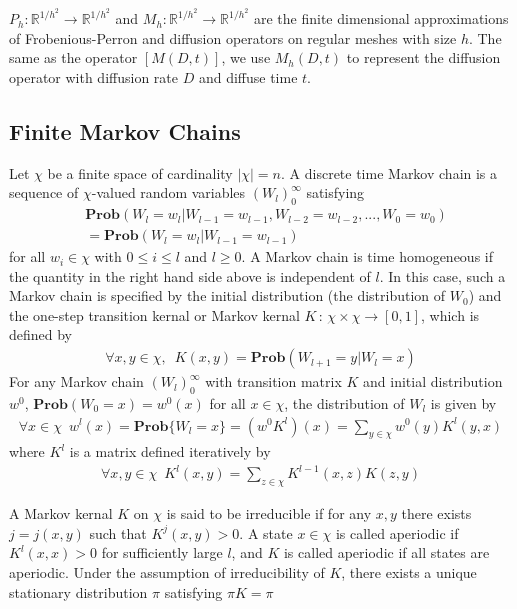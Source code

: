 \documentclass{article}
\begin{document}
$P_h: \mathbb{R}^{1/h^2} \rightarrow \mathbb{R}^{1/h^2} $ and $M_h: \mathbb{R}^{1/h^2} \rightarrow \mathbb{R}^{1/h^2}$ are the finite dimensional approximations of Frobenious-Perron and diffusion operators on regular meshes with size $h$. The same as the operator $[M(D,t)]$, we use $M_h(D,t)$ to represent the diffusion operator with diffusion rate $D$ and diffuse time $t$.


\subsection{Finite Markov Chains}
Let $\chi$ be a finite space of cardinality $|\chi|=n$. A discrete time Markov chain is a sequence of $\chi$-valued random variables $(W_l)_0^{\infty}$ satisfying
\begin{eqnarray*}
 &\mathbf{Prob}(W_l = w_l | W_{l-1} = w_{l-1},W_{l-2} = w_{l-2},...,W_0 = w_0)  \\
 &=\mathbf{Prob}(W_{l} = w_l | W_{l-1} = w_{l-1})
\end{eqnarray*}
for all $w_i \in \chi$ with $0 \le i \le l$ and $l\ge 0$. A Markov chain is time homogeneous if the quantity in the right hand side above is independent of $l$. In this case, such a Markov chain is specified by the initial distribution (the distribution of $W_0$) and the one-step transition kernal or Markov kernal $K\,:\, \chi \times \chi \rightarrow [0,1]$, which is defined by
\begin{eqnarray*}
\forall x,y \in \chi, \,\,\, K(x,y)=\mathbf{Prob}(W_{l+1} = y |
W_{l} = x)
\end{eqnarray*}
For any Markov chain $(W_l)_0^{\infty}$ with transition matrix $K$ and initial distribution $w^0$,  $\mathbf{Prob}(W_0=x)=w^0(x)$ for all $x \in \chi$, the distribution of $W_l$ is given by
\begin{eqnarray}
\label{Kevolvedistribution} \forall x\in \chi \,\,\, w^l(x) =
\mathbf{Prob}\{W_l=x\}=(w^0 K^l)(x)=\sum_{y\in \chi} w^0(y)K^l(y,x)
\end{eqnarray}
where $K^l$ is a matrix defined iteratively by
\begin{eqnarray*}
\forall x,y \in \chi \,\,\, K^l(x,y)=\sum_{z \in
\chi}K^{l-1}(x,z)K(z,y)
\end{eqnarray*}


A Markov kernal $K$ on $\chi$ is said to be irreducible if for any $x,y$ there exists $j = j(x,y)$ such that $K^j(x,y)>0$. A state $x\in\chi$ is called aperiodic if $K^l(x,x)>0$ for sufficiently large $l$, and $K$ is called aperiodic if all states are aperiodic. Under the assumption of irreducibility of $K$, there exists a unique
stationary distribution $\pi$ satisfying $\pi K =\pi$
\end{document}
